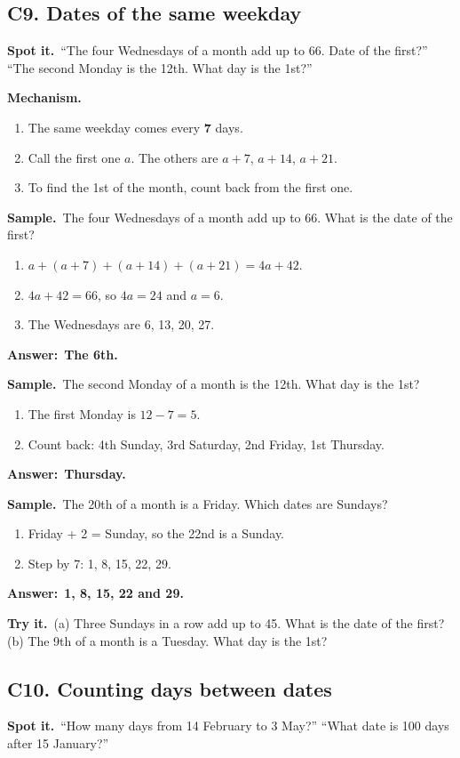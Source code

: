 \documentclass[11pt,a4paper]{article}
\let\oldsubsection\subsection
\renewcommand{\subsection}{\needspace{9\baselineskip}\oldsubsection}
\newcommand{\spot}{\textbf{\color{ember}Spot it.}\ }
\newcommand{\mech}{\textbf{\color{ember}Mechanism.}\ }
\newif\ifkeepsamp
\newcommand{\ans}[1]{\par\nopagebreak\noindent\textbf{\color{ember}Answer:}\ \textbf{#1}\par}
\newcommand{\samp}{\ifkeepsamp\needspace{4\baselineskip}\fi\textbf{\color{ember}Sample.}\ }
\newcommand{\tryit}[1]{\textbf{\color{ember}Try it.}\ #1}
\begin{document}
\subsection{C9. Dates of the same weekday}
\spot ``The four Wednesdays of a month add up to 66. Date of the first?'' ``The second Monday is the 12th. What day is the 1st?''

\mech
\begin{enumerate}
\item The same weekday comes every \textbf{7} days.
\item Call the first one $a$. The others are $a + 7$, $a + 14$, $a + 21$.
\item To find the 1st of the month, count back from the first one.
\end{enumerate}

\samp The four Wednesdays of a month add up to 66. What is the date of the first?
\begin{enumerate}
\item $a + (a + 7) + (a + 14) + (a + 21) = 4a + 42$.
\item $4a + 42 = 66$, so $4a = 24$ and $a = 6$.
\item The Wednesdays are 6, 13, 20, 27.
\end{enumerate}
\ans{The 6th.}

\samp The second Monday of a month is the 12th. What day is the 1st?
\begin{enumerate}
\item The first Monday is $12 - 7 = 5$.
\item Count back: 4th Sunday, 3rd Saturday, 2nd Friday, 1st Thursday.
\end{enumerate}
\ans{Thursday.}

\samp The 20th of a month is a Friday. Which dates are Sundays?
\begin{enumerate}
\item Friday + 2 = Sunday, so the 22nd is a Sunday.
\item Step by 7: 1, 8, 15, 22, 29.
\end{enumerate}
\ans{1, 8, 15, 22 and 29.}

\tryit (a) Three Sundays in a row add up to 45. What is the date of the first? (b) The 9th of a month is a Tuesday. What day is the 1st?

\subsection{C10. Counting days between dates}
\spot ``How many days from 14 February to 3 May?'' ``What date is 100 days after 15 January?''
\end{document}
